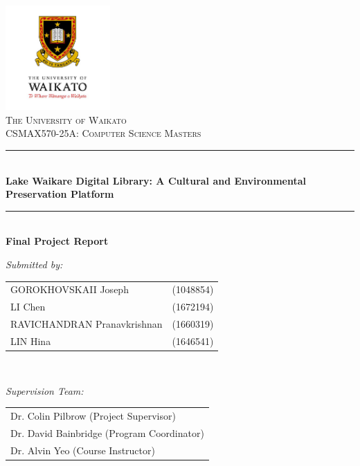 \documentclass[12pt,a4paper]{article}
\begin{document}
\begin{titlepage}
\begin{center}
\vspace*{0.5cm}

\includegraphics[width=0.3\textwidth]{university_logo.png}\\[1cm]

\textsc{\LARGE The University of Waikato}\\[0.5cm]
\textsc{\Large CSMAX570-25A: Computer Science Masters}\\[1.5cm]

\rule{\linewidth}{0.5mm}\\[0.4cm]
{\huge\bfseries Lake Waikare Digital Library: A Cultural and Environmental Preservation Platform}\\[0.4cm]
\rule{\linewidth}{0.5mm}\\[1cm]

{\Large\bfseries Final Project Report}\\[2cm]

\begin{minipage}{\textwidth}
\begin{center} \large
\emph{Submitted by:}\\[0.5cm]
\begin{tabular}{ll}
GOROKHOVSKAII Joseph & (1048854)\\
LI Chen & (1672194)\\
RAVICHANDRAN Pranavkrishnan & (1660319)\\
LIN Hina & (1646541)\\
\end{tabular}
\end{center}
\end{minipage}\\[1.5cm]

\begin{minipage}{\textwidth}
\begin{center} \large
\emph{Supervision Team:}\\[0.5cm]
\begin{tabular}{l}
Dr. Colin Pilbrow (Project Supervisor)\\
Dr. David Bainbridge (Program Coordinator)\\
Dr. Alvin Yeo (Course Instructor)\\
\end{tabular}
\end{center}
\end{minipage}\\[1.5cm]


\end{center}
\end{titlepage}
\end{document}

